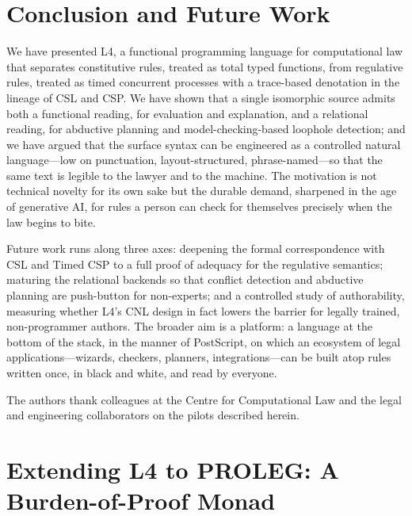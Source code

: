 \documentclass[sigconf,nonacm]{acmart}
\begin{document}
\section{Conclusion and Future Work}\label{sec:conclusion}
We have presented L4, a functional programming language for computational
law that separates constitutive rules, treated as total typed functions,
from regulative rules, treated as timed concurrent processes with a
trace-based denotation in the lineage of CSL and CSP. We have shown that a
single isomorphic source admits both a functional reading, for evaluation
and explanation, and a relational reading, for abductive planning and
model-checking-based loophole detection; and we have argued that the
surface syntax can be engineered as a controlled natural language---low on
punctuation, layout-structured, phrase-named---so that the same text is
legible to the lawyer and to the machine. The motivation is not technical
novelty for its own sake but the durable demand, sharpened in the age of
generative AI, for rules a person can check for themselves precisely when
the law begins to bite.

Future work runs along three axes: deepening the formal correspondence with
CSL and Timed CSP to a full proof of adequacy for the regulative semantics;
maturing the relational backends so that conflict detection and abductive
planning are push-button for non-experts; and a controlled study of
authorability, measuring whether L4's CNL design in fact lowers the barrier
for legally trained, non-programmer authors. The broader aim is a platform:
a language at the bottom of the stack, in the manner of PostScript, on which
an ecosystem of legal applications---wizards, checkers, planners,
integrations---can be built atop rules written once, in black and white,
and read by everyone.

\begin{acks}
The authors thank colleagues at the Centre for Computational Law and the
legal and engineering collaborators on the pilots described herein.
\end{acks}

\appendix
\section{Extending L4 to PROLEG: A Burden-of-Proof Monad}\label{app:proleg}
\end{document}
